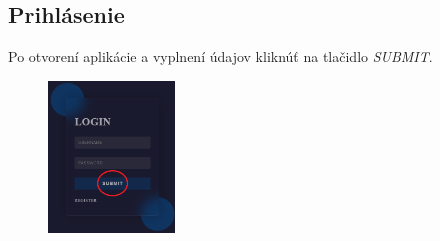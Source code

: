 \begin{figure}[H]
\begin{subfigure}{0.45\textwidth}
    \end{subfigure}
\end{figure}


\subsection{Prihlásenie}
Po otvorení aplikácie a vyplnení údajov kliknúť na tlačidlo \textit{SUBMIT}.
\begin{figure}[H]
    \centering
    \includegraphics[width=0.3\textwidth]{guide_includes/img/login_submit.png}
\end{figure}


